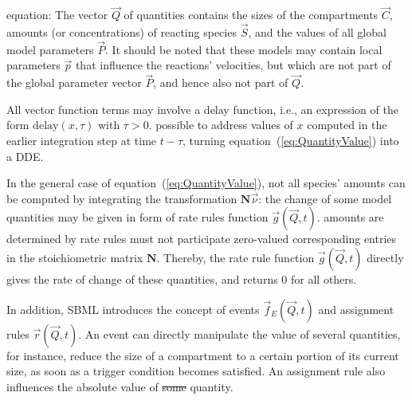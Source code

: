 \documentclass[10pt]{bmc_article}
\newenvironment{bmcformat}{\begin{raggedright}\baselineskip20pt\sloppy\setboolean{publ}{false}}{\end{raggedright}\baselineskip20pt\sloppy}
\begin{document}
\begin{bmcformat}
equation:
The vector $\vec{Q}$ of quantities contains the sizes of the
compartments $\vec{C}$, amounts (or concentrations) of reacting species
$\vec{S}$, and the values of all global model parameters $\vec{P}$.
It should be noted that these models may contain local parameters $\vec{p}$ that
influence the reactions' velocities, but which are not part of the global parameter
vector $\vec{P}$, and hence also not part of $\vec{Q}$.

All vector function terms may involve a delay function, i.e., an expression of 
the form $\mathrm{delay}(x, \tau)$ with $\tau > 0$. 
 possible to address values of $x$ computed in the earlier
integration step at time  $t - \tau$, turning equation~(\ref{eq:QuantityValue})
into a \acf{DDE}. 

In the general case of equation~(\ref{eq:QuantityValue}), not all species' amounts
can be computed by integrating the transformation $\mathbf{N}\vec{\nu}$: the
change of some model quantities may be given in  form of rate rules 
function $\vec{g}(\vec{Q}, t)$.
 amounts are determined by rate rules must not participate  zero-valued corresponding entries in the
stoichiometric matrix $\mathbf{N}$.
Thereby, the rate rule function $\vec{g}(\vec{Q}, t)$ directly gives the rate of
change of these quantities, and returns 0 for all others.

In addition, \acs{SBML} introduces the concept of events $\vec{f}_E(\vec{Q}, t)$ and
assignment rules $\vec{r}(\vec{Q}, t)$.
An event can directly manipulate the value of several quantities, for instance,
reduce the size of a compartment to a certain portion of its current size,
as soon as a trigger condition becomes satisfied.
An assignment rule also influences the absolute value of \sout{some} quantity.


\end{bmcformat}
\end{document}
